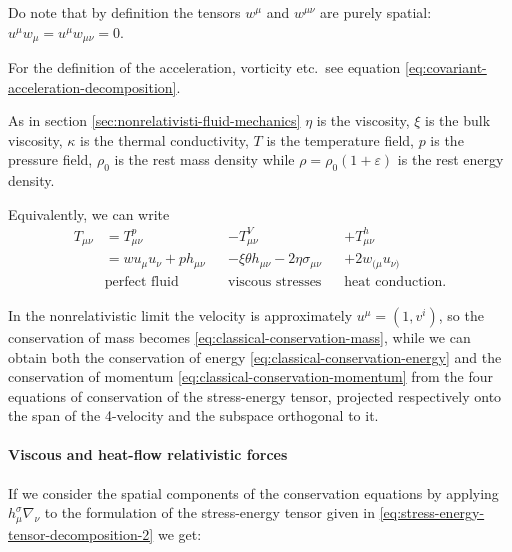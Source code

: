 \documentclass[main.tex]{subfiles}
\begin{document}
Do note that by definition the tensors \(w^\mu\) and \(w^{\mu\nu}\) are purely spatial: \(u^\mu w_\mu = u^\mu w_{\mu \nu} = 0\).

For the definition of the acceleration, vorticity etc.\ see equation \eqref{eq:covariant-acceleration-decomposition}.

As in section \ref{sec:nonrelativisti-fluid-mechanics} \(\eta\) is the viscosity, \(\xi\) is the bulk viscosity,  \(\kappa\) is the thermal conductivity, \(T\) is the temperature field, \(p\) is the pressure field, \(\rho_0\) is the rest mass density while \(\rho = \rho_0 (1 + \varepsilon)\) is the rest energy density.


Equivalently, we can write
\begin{subequations} \label{eq:stress-energy-tensor-decomposition-2}
\begin{align}
  T_{\mu\nu} &= T_{\mu\nu}^p && - T_{\mu\nu}^V &&+ T_{\mu\nu}^h  \\
  &= w u_\mu u_\nu + p h_{\mu\nu} &&-\xi \theta h_{\mu\nu} - 2 \eta \sigma_{\mu\nu} &&+2w_{(\mu} u_{\nu)}  \\
  &\text{perfect fluid} && \text{viscous stresses} && \text{heat conduction.} \nonumber
\end{align}
\end{subequations}

In the nonrelativistic limit the velocity is approximately \(u^\mu = (1, v^i)\), so the conservation of mass becomes \eqref{eq:classical-conservation-mass}, while we can obtain both
the conservation of energy \eqref{eq:classical-conservation-energy}
and the conservation of momentum \eqref{eq:classical-conservation-momentum}
from the four equations of conservation of the stress-energy tensor, projected respectively onto the span of the 4-velocity and the subspace orthogonal to it.

\paragraph{Viscous and heat-flow relativistic forces}

If we consider the spatial components of the conservation equations by applying \(h^\sigma_\mu \nabla_\nu\) to the formulation of the stress-energy tensor given in \eqref{eq:stress-energy-tensor-decomposition-2} we get:
\end{document}

